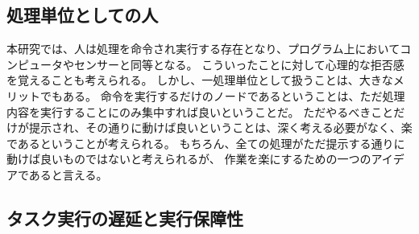 \documentclass[twoside]{wiss}
\begin{document}




\subsection{処理単位としての人}

本研究では、人は処理を命令され実行する存在となり、プログラム上においてコンピュータやセンサーと同等となる。
こういったことに対して心理的な拒否感を覚えることも考えられる。
しかし、一処理単位として扱うことは、大きなメリットでもある。
命令を実行するだけのノードであるということは、ただ処理内容を実行することにのみ集中すれば良いということだ。
ただやるべきことだけが提示され、その通りに動けば良いということは、深く考える必要がなく、楽であるということが考えられる。
もちろん、全ての処理がただ提示する通りに動けば良いものではないと考えられるが、
作業を楽にするための一つのアイデアであると言える。

\subsection{タスク実行の遅延と実行保障性}
\end{document}

